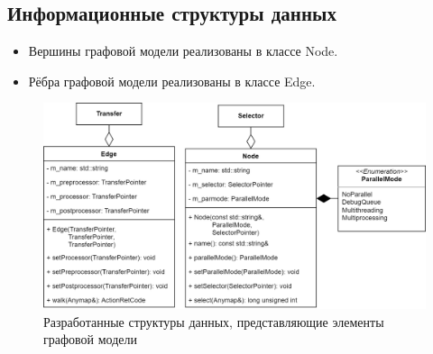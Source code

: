 \subsection{Информационные структуры данных}
\begin{frame}

    \begin{itemize}
        \item Вершины графовой модели реализованы в классе Node.
        \item Рёбра графовой модели реализованы в классе Edge.
    \end{itemize}

    \begin{figure}
        \centering
        \includegraphics[height=0.6\textheight]{images/UML.graphElements.png}
        \caption{Разработанные структуры данных, представляющие элементы графовой модели}
    \end{figure}
\end{frame}

